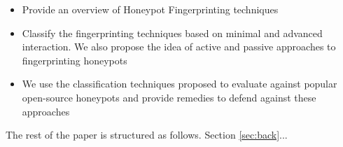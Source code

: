  \begin{itemize}
    \item Provide an overview of Honeypot Fingerprinting techniques
    \item Classify the fingerprinting techniques based on minimal and advanced interaction. We also propose the idea of active and passive approaches to fingerprinting honeypots
    \item We use the classification techniques proposed to evaluate against popular open-source honeypots and provide remedies to defend against these approaches
 \end{itemize}

The rest of the paper is structured as follows. Section \ref{sec:back}...